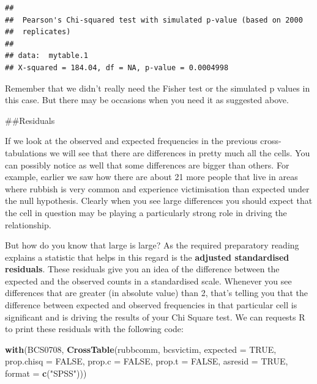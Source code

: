 \documentclass[]{book}
\newenvironment{Shaded}{\begin{snugshade}}{\end{snugshade}}
\newcommand{\DataTypeTok}[1]{\textcolor[rgb]{0.13,0.29,0.53}{#1}}
\newcommand{\FloatTok}[1]{\textcolor[rgb]{0.00,0.00,0.81}{#1}}
\newcommand{\KeywordTok}[1]{\textcolor[rgb]{0.13,0.29,0.53}{\textbf{#1}}}
\newcommand{\NormalTok}[1]{#1}
\newcommand{\OperatorTok}[1]{\textcolor[rgb]{0.81,0.36,0.00}{\textbf{#1}}}
\newcommand{\OtherTok}[1]{\textcolor[rgb]{0.56,0.35,0.01}{#1}}
\newcommand{\StringTok}[1]{\textcolor[rgb]{0.31,0.60,0.02}{#1}}
\theoremstyle{definition}
\theoremstyle{definition}
\theoremstyle{definition}
\theoremstyle{remark}
\begin{document}
\begin{Shaded}
\end{Shaded}

\begin{verbatim}
## 
##  Pearson's Chi-squared test with simulated p-value (based on 2000
##  replicates)
## 
## data:  mytable.1
## X-squared = 184.04, df = NA, p-value = 0.0004998
\end{verbatim}

Remember that we didn't really need the Fisher test or the simulated p
values in this case. But there may be occasions when you need it as
suggested above.

\#\#Residuals

If we look at the observed and expected frequencies in the previous
cross-tabulations we will see that there are differences in pretty much
all the cells. You can possibly notice as well that some differences are
bigger than others. For example, earlier we saw how there are about 21
more people that live in areas where rubbish is very common and
experience victimisation than expected under the null hypothesis.
Clearly when you see large differences you should expect that the cell
in question may be playing a particularly strong role in driving the
relationship.

But how do you know that large is large? As the required preparatory
reading explains a statistic that helps in this regard is the
\textbf{adjusted standardised residuals}. These residuals give you an
idea of the difference between the expected and the observed counts in a
standardised scale. Whenever you see differences that are greater (in
absolute value) than 2, that's telling you that the difference between
expected and observed frequencies in that particular cell is significant
and is driving the results of your Chi Square test. We can requests R to
print these residuals with the following code:

\begin{Shaded}
\begin{Highlighting}[]
\KeywordTok{with}\NormalTok{(BCS0708, }\KeywordTok{CrossTable}\NormalTok{(rubbcomm, bcsvictim, }\DataTypeTok{expected =} \OtherTok{TRUE}\NormalTok{, }\DataTypeTok{prop.chisq =} \OtherTok{FALSE}\NormalTok{, }\DataTypeTok{prop.c =} \OtherTok{FALSE}\NormalTok{,  }\DataTypeTok{prop.t =} \OtherTok{FALSE}\NormalTok{, }\DataTypeTok{asresid =} \OtherTok{TRUE}\NormalTok{, }\DataTypeTok{format =} \KeywordTok{c}\NormalTok{(}\StringTok{"SPSS"}\NormalTok{))) }
\end{Highlighting}
\end{Shaded}
\end{document}
